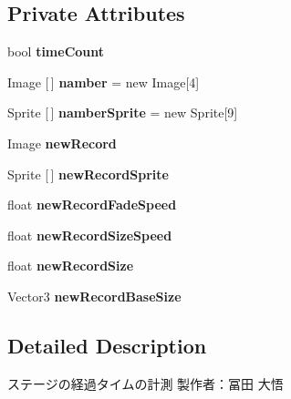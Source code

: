 \subsection*{Private Attributes}
\begin{DoxyCompactItemize}
\item 
\mbox{\label{class_time_counter_a1fd9378cadabcb1ea4eb5cd6dc85902e}} 
bool {\bfseries time\+Count}
\item 
\mbox{\label{class_time_counter_aa274ce0621a1dee89248b197702a0544}} 
Image \mbox{[}$\,$\mbox{]} {\bfseries namber} = new Image\mbox{[}4\mbox{]}
\item 
\mbox{\label{class_time_counter_a07002a0df731f16359da05c315b6d06a}} 
Sprite \mbox{[}$\,$\mbox{]} {\bfseries namber\+Sprite} = new Sprite\mbox{[}9\mbox{]}
\item 
\mbox{\label{class_time_counter_add79c3228c4f4702ccbecf784a63e855}} 
Image {\bfseries new\+Record}
\item 
\mbox{\label{class_time_counter_a0599d20756ddf660c7c8852ec00ecf46}} 
Sprite \mbox{[}$\,$\mbox{]} {\bfseries new\+Record\+Sprite}
\item 
\mbox{\label{class_time_counter_a0889d0dab27628c743319d4f9370d00d}} 
float {\bfseries new\+Record\+Fade\+Speed}
\item 
\mbox{\label{class_time_counter_a3d9c3177f7a21b4ab9e39ea4e967327a}} 
float {\bfseries new\+Record\+Size\+Speed}
\item 
\mbox{\label{class_time_counter_a220e0734db853ef8b224a9baa218d6bc}} 
float {\bfseries new\+Record\+Size}
\item 
\mbox{\label{class_time_counter_ae4f34dc47407b9f51e5dcd96501b4818}} 
Vector3 {\bfseries new\+Record\+Base\+Size}
\end{DoxyCompactItemize}


\subsection{Detailed Description}
ステージの経過タイムの計測 製作者：冨田 大悟 



